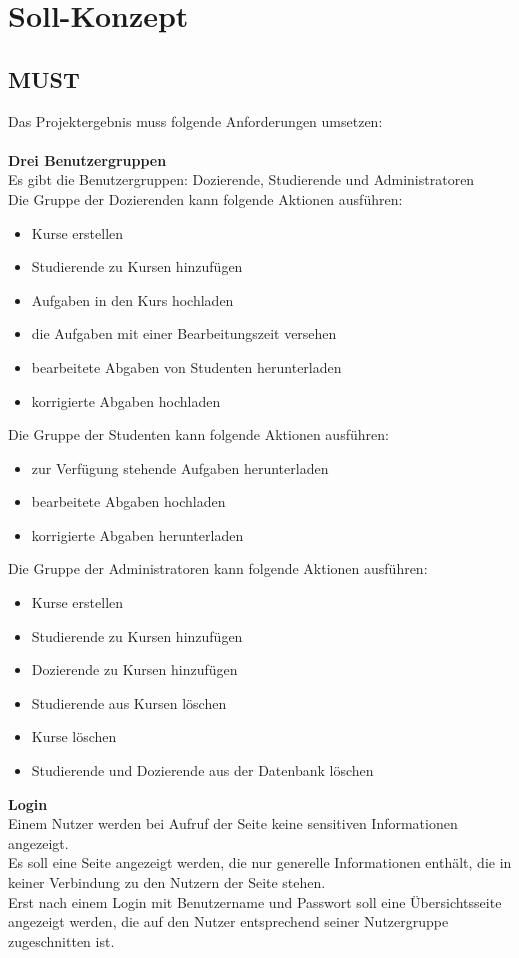 
\chapter{Soll-Konzept}
\section{MUST}
Das Projektergebnis muss folgende Anforderungen umsetzen: \\ \\
\textbf{Drei Benutzergruppen} \\
Es gibt die Benutzergruppen: Dozierende, Studierende und Administratoren \\
Die Gruppe der Dozierenden kann folgende Aktionen ausführen: 
\begin{itemize}
\item Kurse erstellen
\item Studierende zu Kursen hinzufügen 
\item Aufgaben in den Kurs hochladen
\item die Aufgaben mit einer Bearbeitungszeit versehen
\item bearbeitete Abgaben von Studenten herunterladen
\item korrigierte Abgaben hochladen
\end{itemize}
Die Gruppe der Studenten kann folgende Aktionen ausführen:
\begin{itemize}
\item zur Verfügung stehende Aufgaben herunterladen
\item bearbeitete Abgaben hochladen
\item korrigierte Abgaben herunterladen
\end{itemize}
Die Gruppe der Administratoren kann folgende Aktionen ausführen:
\begin{itemize}
\item Kurse erstellen
\item Studierende zu Kursen hinzufügen
\item Dozierende zu Kursen hinzufügen
\item Studierende aus Kursen löschen
\item Kurse löschen
\item Studierende und Dozierende aus der Datenbank löschen
\end{itemize}

\textbf{Login} \\
Einem Nutzer werden bei Aufruf der Seite keine sensitiven Informationen angezeigt. \\
Es soll eine Seite angezeigt werden, die nur generelle Informationen enthält, die in keiner Verbindung zu den Nutzern der Seite stehen. \\
Erst nach einem Login mit Benutzername und Passwort soll eine Übersichtsseite angezeigt werden, die auf den Nutzer entsprechend seiner Nutzergruppe zugeschnitten ist. \\


